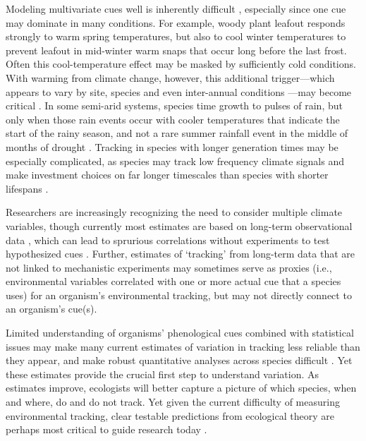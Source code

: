 \documentclass[11pt,letterpaper]{article}
\begin{document}
Modeling multivariate cues well is inherently difficult \citep{chuine2016}, especially since one cue may dominate in many conditions. For example, woody plant leafout responds strongly to warm spring temperatures, but also to cool winter temperatures to prevent leafout in mid-winter warm snaps that occur long before the last frost. Often this cool-temperature effect may be masked by sufficiently cold conditions. With warming from climate change, however, this additional trigger---which appears to vary by site, species and even inter-annual conditions \citep{dennis2003}---may become critical \citep[and potentially lead many phenological models to fail spectacularly in the future as additional cues come into play, see][]{chuine2016}. In some semi-arid systems, species time growth to pulses of rain, but only when those rain events occur with cooler temperatures that indicate the start of the rainy season, and not a rare summer rainfall event in the middle of months of drought \citep{Wainwright:2012tw,wainwright2013}. Tracking in species with longer generation times may be especially complicated, as species may track low frequency climate signals and make investment choices on far longer timescales than species with shorter lifespans \citep{morris2008}. 

Researchers are increasingly recognizing the need to consider multiple climate variables, though currently most estimates are based on long-term observational data \citep[e.g.,][]{chmiel2013,simmonds2019}, which can lead to sprurious correlations without experiments to test hypothesized cues \citep{chuinearees}. Further, estimates of `tracking' from long-term data that are not linked to mechanistic experiments may sometimes serve as proxies (i.e., environmental variables correlated with one or more actual cue that a species uses) for an organism's environmental tracking, but may not directly connect to an organism's cue(s). 

Limited understanding of organisms' phenological cues combined with statistical issues may make many current estimates of variation in tracking less reliable than they appear, and make robust quantitative analyses across species difficult \citep{brown2016,kharouba2018}. Yet these estimates provide the crucial first step to understand variation. As estimates improve, ecologists will better capture a picture of which species, when and where, do and do not track. Yet given the current difficulty of measuring environmental tracking, clear testable predictions from ecological theory are perhaps most critical to guide research today \citep{Smaldino2016}. %
\end{document}
